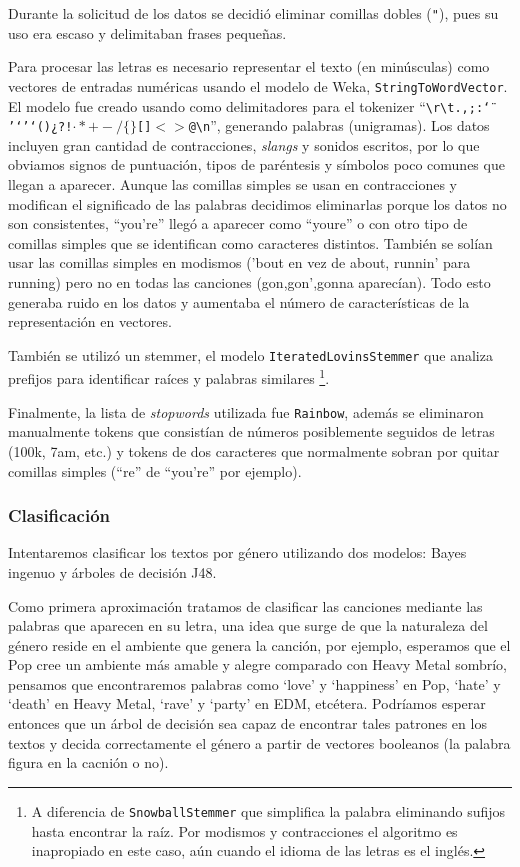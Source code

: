\documentclass[spanish,11pt,letterpaper]{article}
\begin{document}
Durante la solicitud de los datos se decidió eliminar comillas dobles (\texttt{"}),
pues su uso era escaso y delimitaban frases pequeñas.

Para procesar las letras
es necesario representar el texto (en minúsculas) como vectores de entradas numéricas usando
el modelo de Weka, \texttt{StringToWordVector}. El modelo fue creado usando como
delimitadores para el tokenizer
``\texttt{\textvisiblespace\textbackslash r\textbackslash t.,;:\char`\"}%
\texttt{'‘’`()¿?!$\cdot*+-/\{\}$[]$<>$@\textbackslash n}'', generando palabras (unigramas).
Los datos incluyen gran cantidad de contracciones, \textit{slangs} y sonidos escritos, por
lo que obviamos signos de puntuación, tipos de paréntesis y símbolos poco comunes
que llegan a aparecer. Aunque las comillas simples se usan en contracciones y
modifican el significado de las palabras decidimos eliminarlas porque los datos
no son consistentes, ``you're'' llegó a aparecer como ``you\textvisiblespace re''
o con otro tipo de comillas simples que se identifican como caracteres distintos.
También se solían usar las comillas simples en modismos ('bout
en vez de about, runnin' para running) pero no en todas las canciones (gon,gon',gonna
aparecían). Todo esto generaba ruido en los datos y aumentaba el número de
características de la representación en vectores.

También se utilizó un stemmer, el modelo \texttt{IteratedLovinsStemmer} que analiza
prefijos para identificar raíces y palabras similares%
\footnote{A diferencia de \texttt{SnowballStemmer} que simplifica
la palabra eliminando sufijos hasta encontrar la raíz. Por modismos
y contracciones el algoritmo es inapropiado en este caso, aún cuando el idioma
de las letras es el inglés.}.

Finalmente, la lista de \textit{stopwords} utilizada fue \texttt{Rainbow}, además
se eliminaron manualmente tokens que consistían de números posiblemente seguidos de letras
(100k, 7am, etc.) y tokens de dos caracteres que normalmente sobran por quitar
comillas simples (``re'' de ``you're'' por ejemplo).

\subsubsection{Clasificación}

Intentaremos clasificar los textos por género utilizando dos modelos: Bayes ingenuo
y árboles de decisión J48.

Como primera aproximación tratamos de clasificar las canciones mediante las
palabras que aparecen en su letra, una idea que surge de que la
naturaleza del género reside en el ambiente que genera la canción, por ejemplo,
esperamos que el Pop cree un ambiente más amable y alegre comparado con Heavy
Metal sombrío, pensamos que encontraremos palabras como `love' y `happiness' en Pop,
`hate' y `death' en Heavy Metal, `rave' y `party' en EDM, etcétera. Podríamos esperar
entonces que un árbol de decisión sea capaz de encontrar tales patrones en los
textos y decida correctamente el género a partir de vectores booleanos (la
palabra figura en la cacnión o no).
\end{document}
